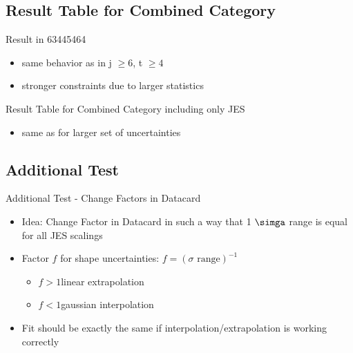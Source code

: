 \subsection{Result Table for Combined Category}
\begin{frame}{Result in 63445464}

\begin{itemize}
\item same behavior as in j $\geq 6$, t $\geq 4$
\item stronger constraints due to larger statistics
\end{itemize}
\end{frame}

\begin{frame}{Result Table for Combined Category including only JES}

\begin{itemize}
\item same as for larger set of uncertainties
\end{itemize}
\end{frame}

\subsection{Additional Test}
\begin{frame}{Additional Test - Change Factors in Datacard}
\begin{itemize}
\item Idea: Change Factor in Datacard in such a way that 1 $\simga$ range is equal for all JES scalings\\

\item Factor $f$ for shape uncertainties: $f = (\sigma \text{ range})^{-1}$
\begin{itemize}
\item $f>1$\rar linear extrapolation\\
\item $f<1$\rar gaussian interpolation

\end{itemize}
\item Fit should be exactly the same if interpolation/extrapolation is working correctly
\end{itemize}
\end{frame}

